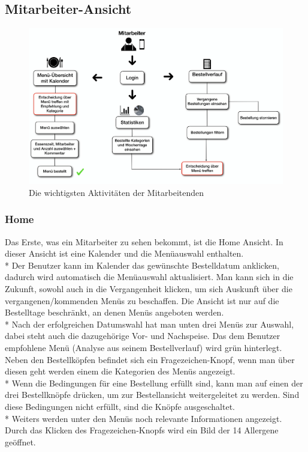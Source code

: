 \subsection {Mitarbeiter-Ansicht}
\begin{figure}[htp]
    \centering
    \includegraphics[scale=0.125]{pics/activity-mitarbeiter.png}
    \caption{Die wichtigsten Aktivitäten der Mitarbeitenden}
    \author{Benjamin Besic}
    \label{fig:impl:ActEmployee}
\end{figure}

\subsubsection {Home}
\label{sec:MitHome}
Das Erste, was ein Mitarbeiter zu sehen bekommt, ist die Home Ansicht. In dieser Ansicht ist eine Kalender und die Menüauswahl enthalten. \\*
Der Benutzer kann im Kalender das gewünschte Bestelldatum anklicken, dadurch wird automatisch die Menüauswahl aktualisiert. Man kann sich in die Zukunft, sowohl auch 
in die Vergangenheit klicken, um sich Auskunft über die vergangenen/kommenden Menüs zu beschaffen. Die Ansicht ist nur auf die Bestelltage beschränkt, an denen Menüs angeboten werden.\\*
Nach der erfolgreichen Datumswahl hat man unten drei Menüs zur Auswahl, dabei steht auch die dazugehörige Vor- und Nachspeise. Das dem Benutzer empfohlene Menü (Analyse aus seinem Bestellverlauf) wird grün hinterlegt.
Neben den Bestellköpfen befindet sich ein Fragezeichen-Knopf, wenn man über diesen geht werden einem die Kategorien des Menüs angezeigt.
\\* Wenn die Bedingungen für eine Bestellung erfüllt sind,
kann man auf einen der drei Bestellknöpfe drücken, um zur Bestellansicht weitergeleitet zu werden. Sind diese Bedingungen nicht erfüllt, sind die Knöpfe ausgeschaltet. \\*
Weiters werden unter den Menüs noch relevante Informationen angezeigt. Durch das Klicken des Fragezeichen-Knopfs wird ein Bild der 14 Allergene geöffnet.

